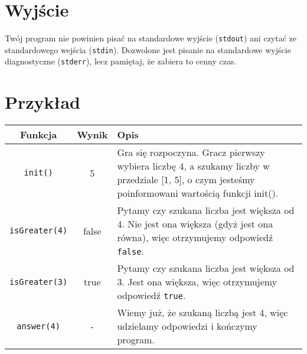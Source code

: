 \documentclass{spiral}
\begin{document}
  \section{Wyjście}
    Twój program nie powinien pisać na standardowe wyjście (\texttt{stdout})
    ani czytać ze standardowego wejścia (\texttt{stdin}).
    Dozwolone jest pisanie na standardowe wyjście diagnostyczne (\texttt{stderr}),
    lecz pamiętaj, że zabiera to cenny czas.

  \section{Przykład}
    \begin{tabular}{|c|c|p{12.5cm}|}
      \hline

      \textbf{Funkcja} & \textbf{Wynik} & \textbf{Opis} \\ \hline

      \texttt{init()} & 5 &
      Gra się rozpoczyna. Gracz pierwszy wybiera liczbę 4,
      a szukamy liczby w przedziale [1, 5], o czym jesteśmy poinformowani
      wartością funkcji init().
      \\ \hline

      \texttt{isGreater(4)} & false &
      Pytamy czy szukana liczba jest większa od 4.
      Nie jest ona większa (gdyż jest ona równa),
      więc otrzymujemy odpowiedź \texttt{false}. 
      \\ \hline

      \texttt{isGreater(3)} & true &
      Pytamy czy szukana liczba jest większa od 3.
      Jest ona większa, więc otrzymujemy odpowiedź \texttt{true}. 
      \\ \hline

      \texttt{answer(4)} & - &
      Wiemy już, że szukaną liczbą jest 4,
      więc udzielamy odpowiedzi i kończymy program.
      \\ \hline
    \end{tabular}
\end{document}
